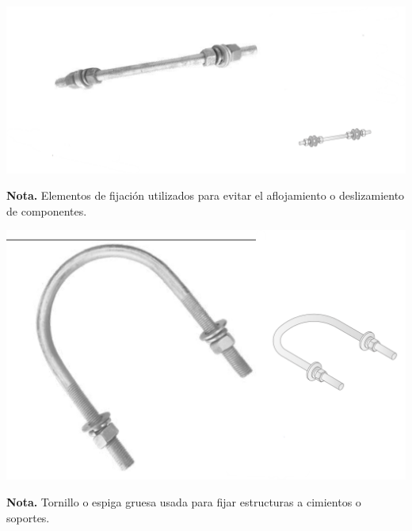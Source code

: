 \vspace{1cm}

\noindent
\begin{minipage}[t]{0.48\textwidth}
    \centering
    \includegraphics[width=\linewidth]{fotosherrajes/pasadores y arandelas de seguridad.png}
    \footnotesize
    \raggedright
    \textbf{Nota.} Elementos de fijación utilizados para evitar el aflojamiento o deslizamiento de componentes.
\end{minipage}%
\hfill
\begin{minipage}[t]{0.48\textwidth}
    \centering
    \includegraphics[width=\linewidth]{fotosherrajes/perno de anclaje.png}
    \footnotesize
    \raggedright
    \textbf{Nota.} Tornillo o espiga gruesa usada para fijar estructuras a cimientos o soportes.
\end{minipage}

\vspace{1cm}

